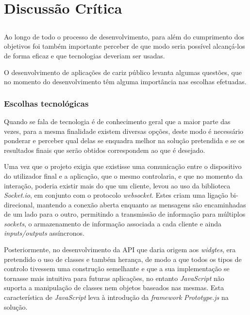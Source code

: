 \chapter{Discussão Crítica} \label{chap:disc}

\section*{}

Ao longo de todo o processo de desenvolvimento, para além do cumprimento dos objetivos foi também importante perceber de que modo seria possível alcançá-los de forma eficaz e que tecnologias deveriam ser usadas.

O desenvolvimento de aplicações de cariz público levanta algumas questões, que no momento do desenvolvimento têm alguma importância nas escolhas efetuadas.

\subsection*{Escolhas tecnológicas}

Quando se fala de tecnologia é de conhecimento geral que a maior parte das vezes, para a mesma finalidade existem diversas opções, deste modo é necessário ponderar e perceber qual delas se enquadra melhor na solução pretendida e se os resultados finais que serão obtidos correspondem ao que é desejado.

Uma vez que o projeto exigia que existisse uma comunicação entre o dispositivo do utilizador final e a aplicação, que o mesmo controlaria, e que no momento da interação, poderia existir mais do que um cliente, levou ao uso da biblioteca \textit{Socket.io}, em conjunto com o protocolo \textit{websocket}. Estes criam uma ligação bi-direcional, mantendo a conexão aberta enquanto as mensagens são encaminhadas de um lado para o outro, permitindo a transmissão de informação para múltiplos \textit{sockets}, o armazenamento de informação associada a cada cliente e ainda \textit{inputs/outputs} assíncronos. 

Posteriormente, no desenvolvimento da API que daria origem aos \textit{widgtes}, era pretendido o uso de classes e também herança, de modo a que todos os tipos de controlo tivessem uma construção semelhante e que a sua implementação se tornasse mais intuitiva para futuras aplicações, no entanto \textit{JavaScript} não suporta a manipulação de classes nem objetos baseados nas mesmas. Esta característica de \textit{JavaScript} leva à introdução da \textit{framework} \textit{Prototype.js} na solução.

